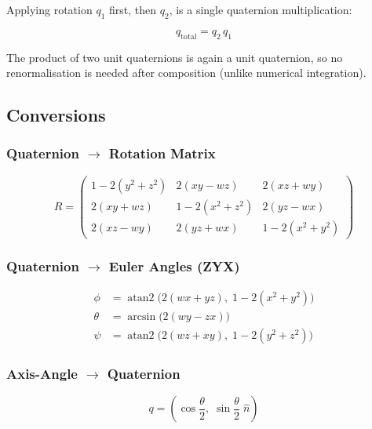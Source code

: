 \documentclass[12pt,a4paper]{article}
\begin{document}
Applying rotation $q_1$ first, then $q_2$, is a single quaternion
multiplication:

\begin{equation}
  q_{\text{total}} = q_2\,q_1
\end{equation}

The product of two unit quaternions is again a unit quaternion, so no
renormalisation is needed after composition (unlike numerical integration).

\subsection{Conversions}

\subsubsection*{Quaternion $\to$ Rotation Matrix}

\begin{equation}
  R = \begin{pmatrix}
    1-2(y^2+z^2) & 2(xy-wz)     & 2(xz+wy) \\
    2(xy+wz)     & 1-2(x^2+z^2) & 2(yz-wx) \\
    2(xz-wy)     & 2(yz+wx)     & 1-2(x^2+y^2)
  \end{pmatrix}
\end{equation}

\subsubsection*{Quaternion $\to$ Euler Angles (ZYX)}

\begin{align}
  \phi   &= \operatorname{atan2}\!\bigl(2(wx+yz),\;1-2(x^2+y^2)\bigr) \\
  \theta &= \arcsin\!\bigl(2(wy-zx)\bigr) \\
  \psi   &= \operatorname{atan2}\!\bigl(2(wz+xy),\;1-2(y^2+z^2)\bigr)
\end{align}

\subsubsection*{Axis-Angle $\to$ Quaternion}

\begin{equation}
  q = \left(\cos\frac{\theta}{2},\;
      \sin\frac{\theta}{2}\;\hat{n}\right)
\end{equation}
\end{document}
